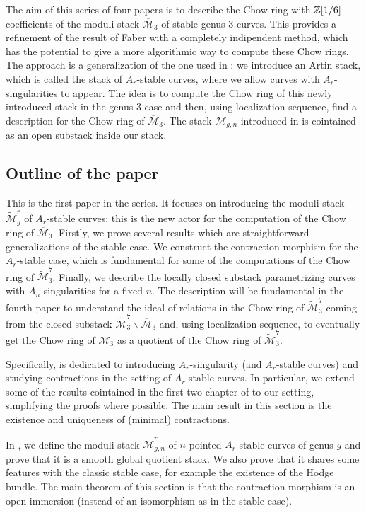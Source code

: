 \documentclass{alggeom}
\numberwithin{equation}{section}
\numberwithin{subsection}{section}
\theoremstyle{definition}
\theoremstyle{remark}
\newcommand\cM{\mathcal{M}} \newcommand\cN{\mathcal{N}}
\renewcommand{\setminus}{\smallsetminus}
\newcommand{\Mbar}{\overline{\cM}}
\newcommand{\Mtilde}{\widetilde{\mathcal M}}
\begin{document}
The aim of this series of four papers is to describe the Chow ring with $\mathbb{Z}[1/6]$-coefficients of the moduli stack $\Mbar_3$ of stable genus $3$ curves. This provides a refinement of the result of Faber with a completely indipendent method, which has the potential to give a more algorithmic way to compute these Chow rings. The approach is a generalization of the one used in \cite{DiLorPerVis}: we introduce an Artin stack, which is called the stack of $A_r$-stable curves, where we allow curves with $A_r$-singularities to appear. The idea is to compute the Chow ring of this newly introduced stack in the genus $3$ case and then, using localization sequence, find a description for the Chow ring of $\Mbar_3$. The stack $\Mtilde_{g,n}$ introduced in \cite{DiLorPerVis} is cointained as an open substack inside our stack. 

\subsection*{Outline of the paper}

This is the first paper in the series. It focuses on introducing the moduli stack $\Mtilde_g^r$ of $A_r$-stable curves: this is the new actor for the computation of the Chow ring of $\Mbar_3$. Firstly, we prove several results which are straightforward generalizations of the stable case. We construct the contraction morphism for the $A_r$-stable case, which is fundamental for some of the computations of the Chow ring of $\Mtilde_3^7$. Finally, we describe the locally closed substack parametrizing curves with $A_n$-singularities for a fixed $n$. The description will be fundamental in the fourth paper to understand the ideal of relations in the Chow ring of $\Mtilde_3^7$ coming from the closed substack $\Mtilde_3^7\setminus \Mbar_3$ and, using localization sequence, to eventually get the Chow ring of $\Mbar_3$ as a quotient of the Chow ring of $\Mtilde_3^7$. 

Specifically,  is dedicated to introducing $A_r$-singularity (and $A_r$-stable curves) and studying contractions in the setting of $A_r$-stable curves. In particular, we extend some of the results cointained in the first two chapter of \cite{Knu} to our setting, simplifying the proofs where possible. The main result in this section is the existence and uniqueness of (minimal) contractions.

In , we define the moduli stack $\Mtilde_{g,n}^r$ of $n$-pointed $A_r$-stable curves of genus $g$ and prove that it is a smooth global quotient stack. We also prove that it shares some features with the classic stable case, for example the existence of the Hodge bundle. The main theorem of this section is that the contraction morphism is an open immersion (instead of an isomorphism as in the stable case).
\end{document}
